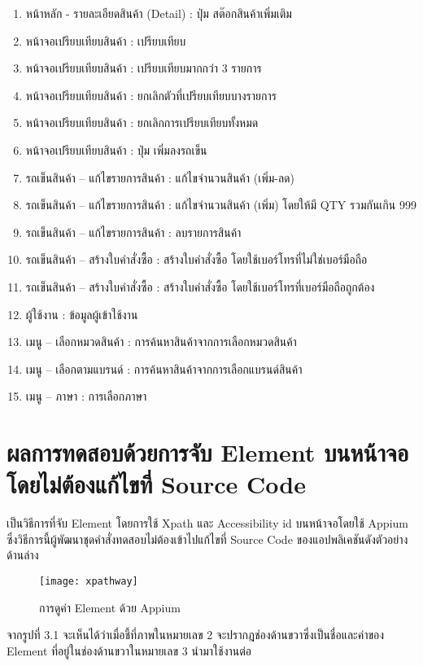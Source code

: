 \begin{enumerate}
        \item หน้าหลัก - รายละเอียดสินค้า (Detail) : ปุ่ม สต๊อกสินค้าเพิ่มเติม
        \item หน้าจอเปรียบเทียบสินค้า : เปรียบเทียบ
        \item หน้าจอเปรียบเทียบสินค้า : เปรียบเทียบมากกว่า 3 รายการ
        \item หน้าจอเปรียบเทียบสินค้า : ยกเลิกตัวที่เปรียบเทียบบางรายการ
        \item หน้าจอเปรียบเทียบสินค้า : ยกเลิกการเปรียบเทียบทั้งหมด
        \item หน้าจอเปรียบเทียบสินค้า : ปุ่ม เพิ่มลงรถเข็น
        \item รถเข็นสินค้า – แก้ไขรายการสินค้า : แก้ไขจำนวนสินค้า (เพิ่ม-ลด)
        \item รถเข็นสินค้า – แก้ไขรายการสินค้า : แก้ไขจำนวนสินค้า (เพิ่ม) โดยให้มี QTY รวมกันเกิน 999
        \item รถเข็นสินค้า – แก้ไขรายการสินค้า : ลบรายการสินค้า
        \item รถเข็นสินค้า – สร้างใบคำสั่งซื้อ : สร้างใบคำสั่งซื้อ โดยใช้เบอร์โทรที่ไม่ใช่เบอร์มือถือ
        \item รถเข็นสินค้า – สร้างใบคำสั่งซื้อ : สร้างใบคำสั่งซื้อ โดยใช้เบอร์โทรที่เบอร์มือถือถูกต้อง
        \item ผู้ใช้งาน : ข้อมูลผู้เข้าใช้งาน
        \item เมนู – เลือกหมวดสินค้า : การค้นหาสินค้าจากการเลือกหมวดสินค้า
        \item เมนู – เลือกตามแบรนด์ : การค้นหาสินค้าจากการเลือกแบรนด์สินค้า
        \item เมนู – ภาษา : การเลือกภาษา
    \end{enumerate}

\newpage
\section{ผลการทดสอบด้วยการจับ Element บนหน้าจอโดยไม่ต้องแก้ไขที่ Source Code}
    เป็นวิธีการที่จับ Element โดยการใช้ Xpath และ Accessibility id บนหน้าจอโดยใช้ Appium ซึ่งวิธีการนี้ผู้พัฒนาชุดคำสั่งทดสอบไม่ต้องเข้าไปแก้ไขที่ Source Code ของแอปพลิเคชันดังตัวอย่างด้านล่าง
    \begin{figure}[H]
        \centering
        \texttt{[image: xpathway]}
        \caption{การดูค่า Element ด้วย Appium}\label{xpathway}
    \end{figure}

    จากรูปที่ 3.1 จะเห็นได้ว่าเมื่อชี้ที่ภาพในหมายเลข 2 จะปรากฎช่องด้านขวาซึ่งเป็นชื่อและค่าของ Element ที่อยู่ในช่องด้านขวาในหมายเลข 3 นำมาใช้งานต่อ

